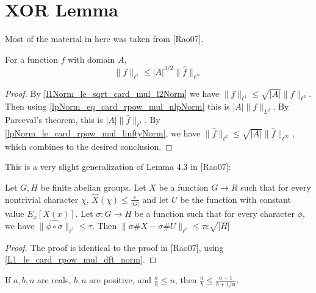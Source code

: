 \chapter{XOR Lemma}
\label{chap:xorlemma}

Most of the material in here was taken from [Rao07].

\begin{theorem}
    \label{L1_le_card_rpow_mul_dft_norm}
    \leanok
    For a function $f$ with domain $A$,
    $$\lVert f \rVert_{\ell^1} \leq |A|^{3/2} \lVert \hat f \rVert_{\ell^\infty}$$
\end{theorem}

\begin{proof}
    \leanok
    By \ref{l1Norm_le_sqrt_card_mul_l2Norm} we have $\lVert f \rVert_{\ell^1} \leq \sqrt{|A|} \lVert f \rVert_{\ell^2}$.
    Then using \ref{lpNorm_eq_card_rpow_mul_nlpNorm} this is $|A| \lVert f \rVert_{L^2}$. By Parceval's theorem,
    this is $|A| \lVert \hat f \rVert_{\ell^2}$. By \ref{lpNorm_le_card_rpow_mul_linftyNorm}, we have 
    $\lVert \hat f \rVert_{\ell^2} \leq \sqrt{|A|} \lVert \hat f \rVert_{\ell^\infty}$, which combines to the desired conclusion.
\end{proof}

\begin{lemma}
    \label{lemma43}
    \leanok
    This is a very slight generalization of Lemma 4.3 in [Rao07]:

    Let $G, H$ be finite abelian groups. Let $X$ be a function $G \to R$ such that for every nontrivial character $\chi$,
    $\hat{X}(\chi) \leq \frac{\varepsilon}{|G|}$ and let $U$ be the function with constant value $E_x[X(x)]$. Let $\sigma: G \to H$ be a
    function such that for every character $\phi$, we have $\lVert \widehat{\phi \circ \sigma} \rVert_{\ell^1} \leq \tau$.
    Then $\lVert \sigma \# X - \sigma \# U \rVert_{\ell^1} \leq \tau \varepsilon \sqrt{|H|}$
\end{lemma}

\begin{proof}
    \leanok
    The proof is identical to the proof in [Rao07], using \ref{L1_le_card_rpow_mul_dft_norm}.
\end{proof}

\begin{lemma}
    \label{le_add_div_add_of_le_of_le}
    \leanok
    If $a, b, n$ are reals, $b, n$ are positive, and $\frac ab \leq n$, then $\frac ab \leq \frac{a+1}{b + 1/n}$.
\end{lemma}

